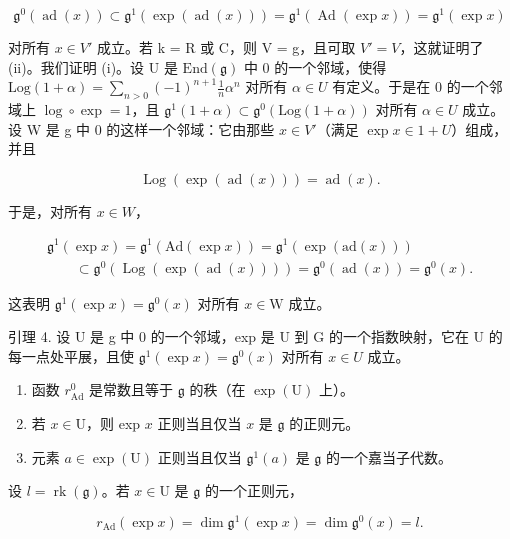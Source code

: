 \[
\mathfrak {g} ^ {0} (\operatorname{ad} (x)) \subset \mathfrak {g} ^ {1} (\exp (\operatorname{ad} (x))) = \mathfrak {g} ^ {1} (\operatorname{Ad} (\exp x)) = \mathfrak {g} ^ {1} (\exp x)
\]

对所有 \(x \in V'\) 成立。若 k = R 或 C，则 V = g，且可取 \(V' = V\)，这就证明了 (ii)。我们证明 (i)。设 U 是 \(\text{End}(\mathfrak{g})\) 中 0 的一个邻域，使得 \(\text{Log}(1 + \alpha) = \sum_{n > 0} (-1)^{n+1} \frac{1}{n} \alpha^n\) 对所有 \(\alpha \in U\) 有定义。于是在 0 的一个邻域上 \(\log \circ \exp = 1\)，且 \(\mathfrak{g}^1(1 + \alpha) \subset \mathfrak{g}^0 (\text{Log}(1 + \alpha))\) 对所有 \(\alpha \in U\) 成立。设 W 是 g 中 0 的这样一个邻域：它由那些 \(x \in V'\)（满足 \(\exp x \in 1 + U\)）组成，并且

\[
\operatorname{Log} (\exp (\operatorname{ad} (x))) = \operatorname{ad} (x).
\]

于是，对所有 \(x \in W\)，

\[
\begin{array}{c} \mathfrak {g} ^ {1} (\exp x) = \mathfrak {g} ^ {1} (\mathrm{Ad} (\exp x)) = \mathfrak {g} ^ {1} (\exp (\mathrm{ad} (x))) \\ \qquad \subset \mathfrak {g} ^ {0} (\operatorname{Log} (\exp (\operatorname{ad} (x)))) = \mathfrak {g} ^ {0} (\operatorname{ad} (x)) = \mathfrak {g} ^ {0} (x). \end{array}
\]

这表明 \(\mathfrak{g}^1 (\exp x) = \mathfrak{g}^0 (x)\) 对所有 \(x\in \mathrm{W}\) 成立。

引理 4. 设 U 是 g 中 0 的一个邻域，exp 是 U 到 G 的一个指数映射，它在 U 的每一点处平展，且使 \(\mathfrak{g}^{1}(\exp x) = \mathfrak{g}^{0}(x)\) 对所有 \(x \in U\) 成立。

\begin{enumerate}
\def\labelenumi{(\roman{enumi})}
\item
  函数 \(r_{\mathrm{Ad}}^0\) 是常数且等于 \(\mathfrak{g}\) 的秩（在 \(\exp(\mathrm{U})\) 上）。
\item
  若 \(x \in \mathrm{U}\)，则 exp \(x\) 正则当且仅当 \(x\) 是 \(\mathfrak{g}\) 的正则元。
\item
  元素 \(a \in \exp(\mathrm{U})\) 正则当且仅当 \(\mathfrak{g}^1(a)\) 是 \(\mathfrak{g}\) 的一个嘉当子代数。
\end{enumerate}

设 \(l = \operatorname{rk}(\mathfrak{g})\)。若 \(x \in \mathrm{U}\) 是 \(\mathfrak{g}\) 的一个正则元，

\[
r _ {\mathrm{Ad}} (\exp x) = \dim \mathfrak {g} ^ {1} (\exp x) = \dim \mathfrak {g} ^ {0} (x) = l.
\]

